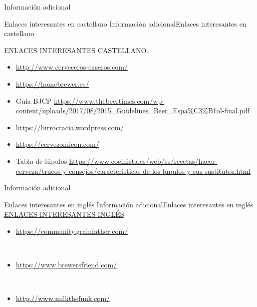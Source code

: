 \begin{frame}{Información adicional}
\protect\hypertarget{informaciuxf3n-adicional}{}
\begin{block}{Enlaces interesantes en castellano}
\protect\hypertarget{enlaces-interesantes-en-castellano}{}
Información adicionalEnlaces interesantes en castellano

ENLACES INTERESANTES CASTELLANO.

\begin{itemize}
\item
  \url{http://www.cerveceros-caseros.com/}
\item
  \url{https://homebrewer.es/}
\item
  Guía BJCP
  \url{https://www.thebeertimes.com/wp-content/uploads/2017/08/2015_Guidelines_Beer_Espa\%C3\%B1ol-final.pdf}
\item
  \url{https://birrocracia.wordpress.com/}
\item
  \url{https://cervezomicon.com/}
\item
  Tabla de lúpulos
  \url{https://www.cocinista.es/web/es/recetas/hacer-cerveza/trucos-y-consejos/caracteristicas-de-los-lupulos-y-sus-sustitutos.html}
\end{itemize}
\end{block}
\end{frame}

\begin{frame}{Información adicional}
\protect\hypertarget{informaciuxf3n-adicional-1}{}
\begin{block}{Enlaces interesantes en inglés}
\protect\hypertarget{enlaces-interesantes-en-ingluxe9s}{}
Información adicionalEnlaces interesantes en inglés \uline{ENLACES
INTERESANTES INGLÉS}\\

\begin{itemize}
\item
  \url{https://community.grainfather.com/}\strut \\
\item
  \url{https://www.brewersfriend.com/}\strut \\
\item
  \url{http://www.milkthefunk.com/}\strut \\
\end{itemize}
\end{block}
\end{frame}

